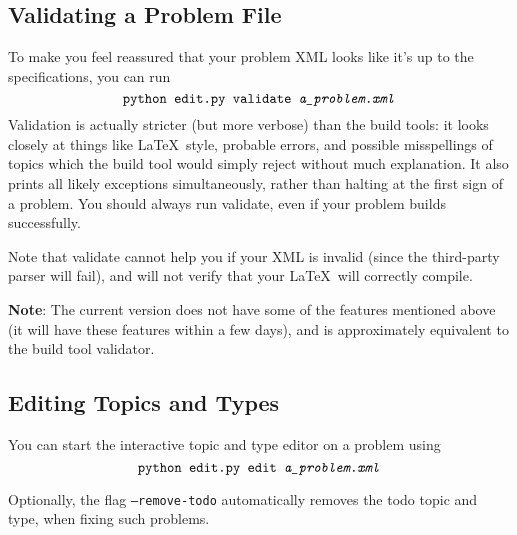   \subsection{Validating a Problem File}
    To make you feel reassured that your problem XML looks like it's up to the specifications, you can run \[\texttt{python edit.py }\texttt{validate \textit{a\_problem.xml}}\] Validation is actually stricter (but more verbose) than the build tools: it looks closely at things like \LaTeX\ style, probable errors, and possible misspellings of topics which the build tool would simply reject without much explanation. It also prints all likely exceptions simultaneously, rather than halting at the first sign of a problem. You should always run validate, even if your problem builds successfully.
    
    Note that validate cannot help you if your XML is invalid (since the third-party parser will fail), and will not verify that your \LaTeX\ will correctly compile.
    
    \textbf{Note}: The current version does not have some of the features mentioned above (it will have these features within a few days), and is approximately equivalent to the build tool validator.
    
  \subsection{Editing Topics and Types}
    You can start the interactive topic and type editor on a problem using \[\texttt{python edit.py }\texttt{edit \textit{a\_problem.xml}}\]
    
    Optionally, the flag \texttt{--remove-todo} automatically removes the todo topic and type, when fixing such problems.